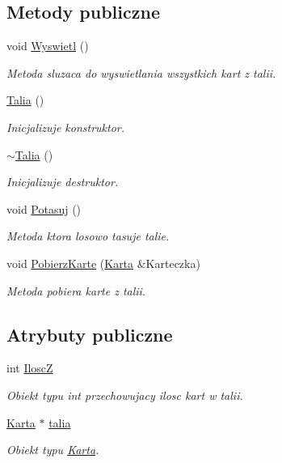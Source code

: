 \subsection*{Metody publiczne}
\begin{DoxyCompactItemize}
\item 
void \hyperlink{class_talia_aafcb8bcf4110ec648a2bdbfdff7987c1}{Wyswietl} ()
\begin{DoxyCompactList}\small\item\em Metoda sluzaca do wyswietlania wszystkich kart z talii. \end{DoxyCompactList}\item 
\hyperlink{class_talia_a4a8993da8a2ac459510086ed77b31edf}{Talia} ()
\begin{DoxyCompactList}\small\item\em Inicjalizuje konstruktor. \end{DoxyCompactList}\item 
\hyperlink{class_talia_a45eec398669ef254f01c5daca8a2dae3}{$\sim$\-Talia} ()
\begin{DoxyCompactList}\small\item\em Inicjalizuje destruktor. \end{DoxyCompactList}\item 
void \hyperlink{class_talia_a6c0e27d70bbbfbbcb14d6f65073bebb8}{Potasuj} ()
\begin{DoxyCompactList}\small\item\em Metoda ktora losowo tasuje talie. \end{DoxyCompactList}\item 
void \hyperlink{class_talia_a7ed9525f83b4260dacc192cffca859d5}{Pobierz\-Karte} (\hyperlink{class_karta}{Karta} \&Karteczka)
\begin{DoxyCompactList}\small\item\em Metoda pobiera karte z talii. \end{DoxyCompactList}\end{DoxyCompactItemize}
\subsection*{Atrybuty publiczne}
\begin{DoxyCompactItemize}
\item 
int \hyperlink{class_talia_a6417818a1fa3d920934fb850f4ace4bf}{Ilosc\-Z}
\begin{DoxyCompactList}\small\item\em Obiekt typu int przechowujacy ilosc kart w talii. \end{DoxyCompactList}\item 
\hyperlink{class_karta}{Karta} $\ast$ \hyperlink{class_talia_a611bbe0aca740339a6d4c761afe228c2}{talia}
\begin{DoxyCompactList}\small\item\em Obiekt typu \hyperlink{class_karta}{Karta}. \end{DoxyCompactList}\end{DoxyCompactItemize}
